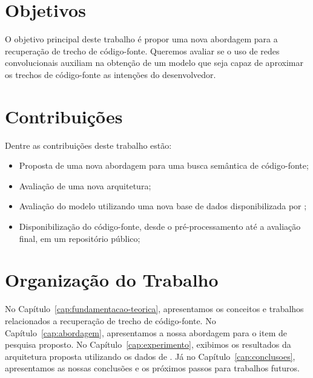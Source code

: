 \section{Objetivos}
\label{sec:objetivo}

O objetivo principal deste trabalho é propor uma nova abordagem para a recuperação de trecho de código-fonte. Queremos avaliar se o uso de redes convolucionais auxiliam na obtenção de um modelo que seja capaz de aproximar os trechos de código-fonte as intenções do desenvolvedor. 

\section{Contribuições}
\label{sec:contribucoes}

Dentre as contribuições deste trabalho estão:

\begin{itemize}
\item Proposta de uma nova abordagem para uma busca semântica de código-fonte;
\item Avaliação de uma nova arquitetura;
\item Avaliação do modelo utilizando uma nova base de dados disponibilizada por \cite{yao-2018};
\item Disponibilização do código-fonte, desde o pré-processamento até a avaliação final, em um repositório público;
\end{itemize}

\section{Organização do Trabalho}
\label{sec:organizacao_trabalho}

No Capítulo~\ref{cap:fundamentacao-teorica}, apresentamos os conceitos e trabalhos relacionados a recuperação de trecho de código-fonte. No Capítulo~\ref{cap:abordagem}, apresentamos a nossa abordagem para o item de pesquisa proposto. No Capítulo~\ref{cap:experimento}, exibimos os resultados da arquitetura proposta utilizando os dados de \cite{yao-2018}. Já no Capítulo~\ref{cap:conclusoes}, apresentamos as nossas conclusões e os próximos passos para trabalhos futuros.